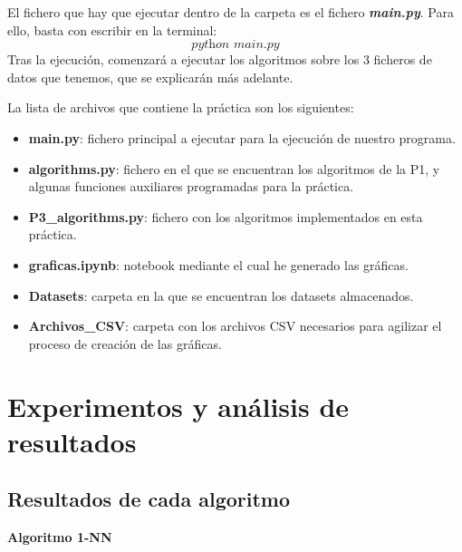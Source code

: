 \documentclass[10pt, a4paper]{article}
\theoremstyle{theorem-style}
\theoremstyle{theorem-style}
\theoremstyle{theorem2-style}
\theoremstyle{definition-style}
\theoremstyle{remark-style}
\theoremstyle{example-style}
\theoremstyle{definition-style}
\theoremstyle{remark-style}
\theoremstyle{remark-style}
\begin{document}
El fichero que hay que ejecutar dentro de la carpeta es el fichero \emph{\textbf{main.py}}. Para ello, basta con escribir en la terminal:
\[
\textit{python main.py}
\]
Tras la ejecución, comenzará a ejecutar los algoritmos sobre los 3 ficheros de datos que tenemos, que se explicarán más adelante.

La lista de archivos que contiene la práctica son los siguientes:
\begin{itemize}
	\item \textbf{main.py}: fichero principal a ejecutar para la ejecución de nuestro programa.	
	\item \textbf{algorithms.py}: fichero en el que se encuentran los algoritmos de la P1, y algunas funciones auxiliares programadas para la práctica.
\item \textbf{P3\_algorithms.py}: fichero con los algoritmos implementados en esta práctica. 
	\item \textbf{graficas.ipynb}: notebook mediante el cual he generado las gráficas.  
	\item \textbf{Datasets}: carpeta en la que se encuentran los datasets almacenados.
	\item \textbf{Archivos\_CSV}: carpeta con los archivos CSV necesarios para agilizar el proceso de creación de las gráficas.
	
\end{itemize}
\newpage
\section{Experimentos y análisis de resultados}

\subsection{Resultados de cada algoritmo}

\textbf{Algoritmo 1-NN}
\end{document}
